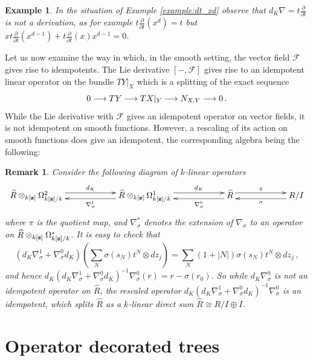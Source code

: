 \documentclass[english,letter paper,12pt,leqno]{article}
\theoremstyle{example}
\newtheorem{example}[theorem]{Example}
\newtheorem{remark}[theorem]{Remark}
\numberwithin{equation}{section}
\begin{document}
\begin{example}\label{example:dt_xd2} In the situation of Example \ref{example:dt_xd} observe that $d_K \nabla = t \frac{\partial}{\partial t}$ is \emph{not} a derivation, as for example $t\frac{\partial}{\partial t}( x^d ) = t$ but $x t \frac{\partial}{\partial t}(x^{d-1}) + t \frac{\partial}{\partial t}(x) x^{d-1} = 0$.
\end{example}

Let us now examine the way in which, in the smooth setting, the vector field $\mathscr{F}$ gives rise to idempotents. The Lie derivative $[-, \mathscr{F}]$ gives rise to an idempotent linear operator on the bundle $TY|_X$ which is a splitting of the exact sequence 
\[
0 \longrightarrow TY \longrightarrow TX|_Y \longrightarrow N_{X,Y} \longrightarrow 0\,.
\]
While the Lie derivative with $\mathscr{F}$ gives an idempotent operator on vector fields, it is not idempotent on smooth functions. However, a rescaling of its action on smooth functions does give an idempotent, the corresponding algebra being the following:

\begin{remark} Consider the following diagram of $k$-linear operators
\[
\xymatrix@C+3pc@R+2pc{
\widehat{R} \otimes_{k[\bold{z}]} \Omega^2_{k[\bold{z}]/k} \ar@<0.8ex>[r]^-{d_K} &
\widehat{R} \otimes_{k[\bold{z}]} \Omega^1_{k[\bold{z}]/k} \ar@<0.8ex>[l]^-{\nabla^1_\sigma}\ar@<0.8ex>[r]^-{d_K} & \widehat{R} \ar@<0.8ex>[l]^-{\nabla^0_\sigma} \ar@<0.8ex>[r]^-{\pi} & R/I \ar@<0.8ex>[l]^-{\sigma}
}
\]
where $\pi$ is the quotient map, and $\nabla^*_\sigma$ denotes the extension of $\nabla_\sigma$ to an operator on $\widehat{R} \otimes_{k[\bold{z}]} \Omega^*_{k[\bold{z}]/k}$. It is easy to check that
\[
\left( d_K \nabla^1_\sigma + \nabla^0_\sigma d_K \right)\left( \sum_N \sigma(s_N)t^N \otimes dz_j \right) = \sum_N (1 + |N|) \sigma(s_N) t^N \otimes dz_j\,,
\]
and hence $d_K \left( d_K \nabla^1_\sigma + \nabla^0_\sigma d_K \right)^{-1} \nabla^0_\sigma(r) = r - \sigma(r_0)$. So while $d_K \nabla^0_\sigma$ is not an idempotent operator on $\widehat{R}$, the rescaled operator $d_K \left( d_K \nabla^1_\sigma + \nabla^0_\sigma d_K \right)^{-1} \nabla^0_\sigma$ is an idempotent, which splits $\widehat{R}$ as a $k$-linear direct sum $\widehat{R} \cong R/I \oplus I$.
\end{remark}

\section{Operator decorated trees}
\end{document}
